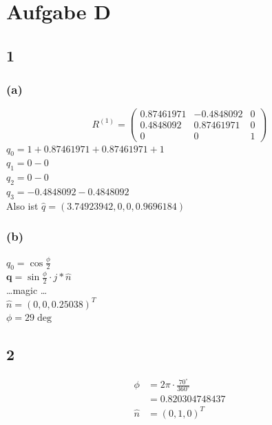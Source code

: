\documentclass{../Vorlage/mat}
\begin{document}
\section*{Aufgabe D}
\subsection*{1}
\subsubsection*{(a)}
\begin{equation}
	R^{(1)} = \begin{pmatrix}
	0.87461971 & -0.4848092 & 0 \\
	0.4848092 & 0.87461971 & 0\\
	0&0&1
	\end{pmatrix}
\end{equation}
$q_0 = 1 + 0.87461971 + 0.87461971 + 1$\\
$q_1 = 0 - 0$\\
$q_2 = 0 - 0$\\
$q_3 = -0.4848092 - 0.4848092$\\
Also ist $\hat{q} = (3.74923942, 0, 0, 0.9696184)$
\subsubsection*{(b)}
$q_0 = \cos{\frac{\phi}{2}}$\\
$\mathbf{q} = \sin{\frac{\phi}{2}}\cdot j * \hat{n}$\\
\ldots magic \ldots\\
$\hat{n} = (0,0,0.25038)^T$\\
$\phi = 29\deg$
\subsection*{2}
\begin{align*}
\phi & = 2 \pi \cdot \frac{70^{\circ}}{360^{\circ}}\\
& = 0.820304748437 \\
\hat{n} & = (0,1,0)^T
\end{align*}
\end{document}
